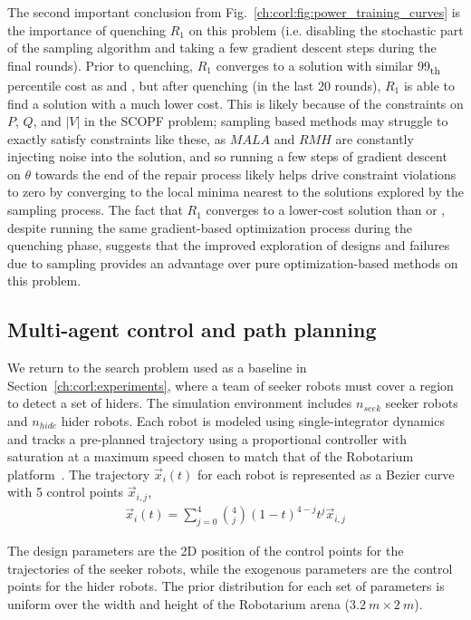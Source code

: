 The second important conclusion from Fig.~\ref{ch:corl:fig:power_training_curves} is the importance of quenching $R_1$ on this problem (i.e. disabling the stochastic part of the sampling algorithm and taking a few gradient descent steps during the final rounds). Prior to quenching, $R_1$ converges to a solution with similar 99\textsubscript{th} percentile cost as \gdr{} and \gda{}, but after quenching (in the last 20 rounds), $R_1$ is able to find a solution with a much lower cost. This is likely because of the constraints on $P$, $Q$, and $|V|$ in the SCOPF problem; sampling based methods may struggle to exactly satisfy constraints like these, as $MALA$ and $RMH$ are constantly injecting noise into the solution, and so running a few steps of gradient descent on $\theta$ towards the end of the repair process likely helps drive constraint violations to zero by converging to the local minima nearest to the solutions explored by the sampling process. The fact that $R_1$ converges to a lower-cost solution than \gdr{} or \gda{}, despite running the same gradient-based optimization process during the quenching phase, suggests that the improved exploration of designs and failures due to sampling provides an advantage over pure optimization-based methods on this problem.

\subsection{Multi-agent control and path planning}

We return to the search problem used as a baseline in Section~\ref{ch:corl:experiments}, where a team of seeker robots must cover a region to detect a set of hiders. The simulation environment includes $n_{seek}$ seeker robots and $n_{hide}$ hider robots. Each robot is modeled using single-integrator dynamics and tracks a pre-planned trajectory using a proportional controller with saturation at a maximum speed chosen to match that of the Robotarium platform~\cite{wilsonRobotariumGloballyImpactful2020}. The trajectory $\vec{x}_i(t)$ for each robot is represented as a Bezier curve with 5 control points $\vec{x}_{i, j}$,
\begin{align*}
    \vec{x}_i(t) = \sum_{j=0}^4 \binom{4}{j}(1-t)^{4-j}t^j \vec{x}_{i, j}
\end{align*}

The design parameters are the 2D position of the control points for the trajectories of the seeker robots, while the exogenous parameters are the control points for the hider robots. The prior distribution for each set of parameters is uniform over the width and height of the Robotarium arena ($\SI{3.2}{m}\times\SI{2}{m}$).

